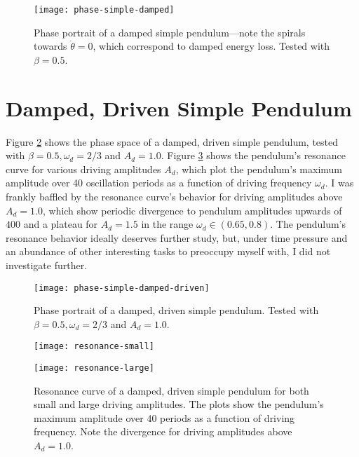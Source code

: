\documentclass[11pt, a4paper]{article}
\begin{document}
\begin{figure}
\centering
\texttt{[image: phase-simple-damped]}
\vspace{-3mm}
\caption{Phase portrait of a damped simple pendulum---note the spirals towards $ \dot{\theta} = 0 $, which correspond to damped energy loss. Tested with $ \beta = 0.5 $.}

\label{newton:fig:phase-simple-damped}
\end{figure}


\section{Damped, Driven Simple Pendulum}
Figure \ref{newton:fig:phase-simple-damped-driven} shows the phase space of a damped, driven simple pendulum, tested with $ \beta = 0.5, \omega_{d} = 2/3 $ and $ A_{d} = 1.0 $.  Figure \ref{newton:fig:resonance} shows the pendulum's resonance curve for various driving amplitudes $ A_{d} $, which plot the pendulum's maximum amplitude over 40 oscillation periods as a function of driving frequency $ \omega_{d} $. I was frankly baffled by the resonance curve's behavior for driving amplitudes above $ A_{d} = 1.0 $, which show periodic divergence to pendulum amplitudes upwards of $ 400 $ and a plateau for $ A_{d} = 1.5 $ in the range $ \omega_{d} \in (0.65, 0.8) $. The pendulum's resonance behavior ideally deserves further study, but, under time pressure and an abundance of other interesting tasks to preoccupy myself with, I did not investigate further.


\begin{figure}[htb!]
\centering
\texttt{[image: phase-simple-damped-driven]}
\vspace{-5mm}
\caption{Phase portrait of a damped, driven simple pendulum. Tested with $ \beta = 0.5, \omega_{d} = 2/3 $ and $ A_{d} = 1.0 $.}

\label{newton:fig:phase-simple-damped-driven}
\end{figure}



\begin{figure}
\centering
\texttt{[image: resonance-small]} \vfill 

\texttt{[image: resonance-large]} \vfill 

\caption{Resonance curve of a damped, driven simple pendulum for both small and large driving amplitudes. The plots show the pendulum's maximum amplitude over 40 periods as a function of driving frequency. Note the divergence for driving amplitudes above $ A_{d} = 1.0 $.}

\label{newton:fig:resonance}
\end{figure}
\end{document}
